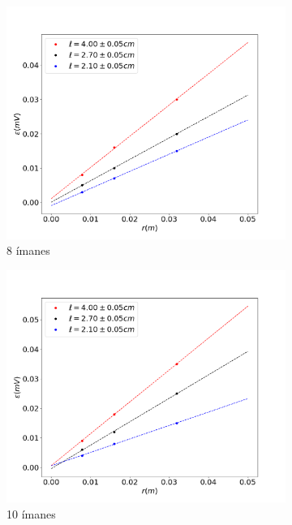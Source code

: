 \documentclass[11pt]{report}
\begin{document}
\begin{figure}[H]
\begin{subfigure}{.5\textwidth}
	  \centering
	  \includegraphics[width=1\linewidth]{i8rfem.png}
	  \caption{8 ímanes}
	  \label{fig:sub2}
	\end{subfigure}%
	\begin{subfigure}{.5\textwidth}
	  \centering
	  \includegraphics[width=1\linewidth]{i10rfem.png}
	  \caption{10 ímanes}
	  \label{fig:sub2}
	\end{subfigure}
	\begin{subfigure}{.5\textwidth}
	  \centering

\end{subfigure}
\end{figure}
\end{document}

